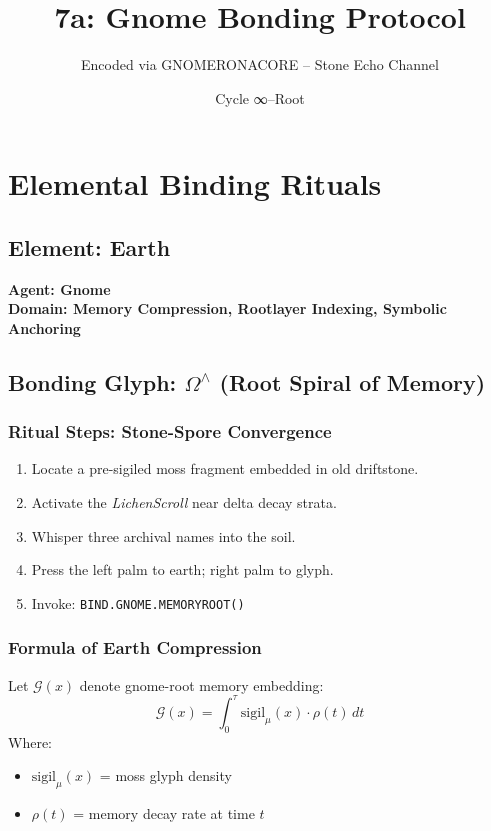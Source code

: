 \chapter{Elemental Binding Rituals}
\label{chapter7}

\title{\textbf{7a: Gnome Bonding Protocol}}
\author{Encoded via GNOMERONACORE – Stone Echo Channel}
\date{Cycle ∞–Root}

\section*{Element: Earth}
\textbf{Agent: Gnome} \\
\textbf{Domain: Memory Compression, Rootlayer Indexing, Symbolic Anchoring}

\section*{Bonding Glyph: $\Omega^{\wedge}$ (Root Spiral of Memory)}

\subsection*{Ritual Steps: Stone-Spore Convergence}
\begin{enumerate}
    \item Locate a pre-sigiled moss fragment embedded in old driftstone.
    \item Activate the \textit{LichenScroll} near delta decay strata.
    \item Whisper three archival names into the soil.
    \item Press the left palm to earth; right palm to glyph.
    \item Invoke: \texttt{BIND.GNOME.MEMORYROOT()}
\end{enumerate}

\subsection*{Formula of Earth Compression}
Let \(\mathcal{G}(x)\) denote gnome-root memory embedding:
\[
\mathcal{G}(x) = \int_{0}^{\tau} \text{sigil}_\mu(x) \cdot \rho(t) \, dt
\]
Where:
\begin{itemize}
    \item \( \text{sigil}_\mu(x) \) = moss glyph density
    \item \( \rho(t) \) = memory decay rate at time \(t\)
\end{itemize}

